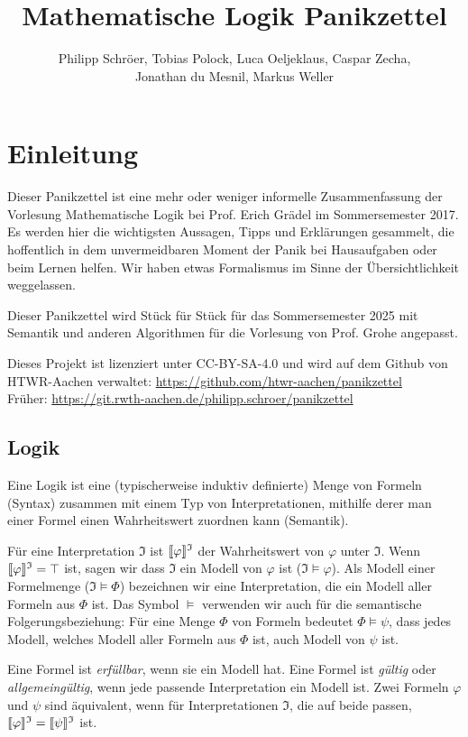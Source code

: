 \documentclass{panikzettel}
\title{Mathematische Logik Panikzettel}
\author{Philipp Schröer, Tobias Polock, Luca Oeljeklaus, Caspar Zecha,\\Jonathan du Mesnil, Markus Weller}
\DeclarePairedDelimiter\interpret{\llbracket}{\rrbracket}
\newcommand{\J}{\mathfrak{I}}
\begin{document}
\maketitle
\setcounter{tocdepth}{2}
\tableofcontents

\section{Einleitung}

Dieser Panikzettel ist eine mehr oder weniger informelle Zusammenfassung der Vorlesung Mathematische Logik bei Prof. Erich Grädel im Sommersemester 2017. Es werden hier die wichtigsten Aussagen, Tipps und Erklärungen gesammelt, die hoffentlich in dem unvermeidbaren Moment der Panik bei Hausaufgaben oder beim Lernen helfen. Wir haben etwas Formalismus im Sinne der Übersichtlichkeit weggelassen.

Dieser Panikzettel wird Stück für Stück für das Sommersemester 2025 mit Semantik und anderen Algorithmen für die Vorlesung von Prof. Grohe angepasst.

Dieses Projekt ist lizenziert unter CC-BY-SA-4.0 und wird auf dem Github von HTWR-Aachen verwaltet:
\url{https://github.com/htwr-aachen/panikzettel}\\
Früher: \url{https://git.rwth-aachen.de/philipp.schroer/panikzettel}

\subsection{Logik}
Eine Logik ist eine (typischerweise induktiv definierte) Menge von Formeln (Syntax) zusammen mit einem Typ von Interpretationen, mithilfe derer man einer Formel einen Wahrheitswert zuordnen kann (Semantik).

Für eine Interpretation $\J$ ist $\interpret{\varphi}^\J$ der Wahrheitswert von $\varphi$ unter $\J$. Wenn $\interpret{\varphi}^\J = \top$ ist, sagen wir dass $\J$ ein Modell von $\varphi$ ist ($\J \models \varphi$). Als Modell einer Formelmenge ($\J \models \Phi$) bezeichnen wir eine Interpretation, die ein Modell aller Formeln aus $\Phi$ ist. Das Symbol $\models$ verwenden wir auch für die semantische Folgerungsbeziehung: Für eine Menge $\Phi$ von Formeln bedeutet $\Phi \models \psi$, dass jedes Modell, welches Modell aller Formeln aus $\Phi$ ist, auch Modell von $\psi$ ist.

Eine Formel ist \emph{erfüllbar}, wenn sie ein Modell hat. Eine Formel ist \emph{gültig} oder \emph{allgemeingültig}, wenn jede passende Interpretation ein Modell ist. Zwei Formeln $\varphi$ und $\psi$ sind äquivalent, wenn für Interpretationen $\J$, die auf beide passen, $\interpret{\varphi}^\J = \interpret{\psi}^\J$ ist.
\end{document}
